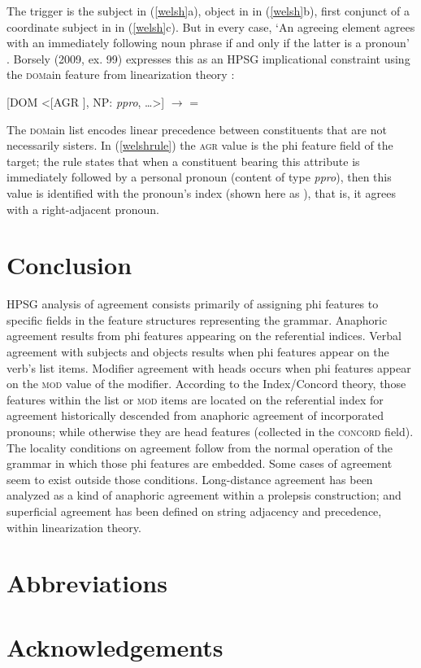\documentclass[output=paper]{langsci/langscibook}
\begin{document}
\noindent
The trigger is the subject in (\ref{welsh}a), object in in (\ref{welsh}b), first conjunct of a coordinate subject in in (\ref{welsh}c).  But in every case, `An agreeing element agrees with an immediately following noun phrase if and only if the latter is a pronoun' \citep[ex. \, 48]{Borsley:2009}.  Borsely (2009, ex. 99) expresses this as an HPSG implicational constraint using the \textsc{dom}ain feature from linearization theory \citep{reape:1994,Kathol:2000}:

\begin{exe}
\ex \label{welshrule}
[DOM  <[AGR ], NP: \textit{ppro}, \ldots >]  $\rightarrow$  = 
\end{exe}

\noindent
The \textsc{dom}ain list encodes linear precedence between constituents that are not necessarily sisters.  In (\ref{welshrule}) the \textsc{agr} value is the phi feature field of the target; the rule states that when a constituent bearing this attribute is immediately followed by a personal pronoun (content of type \textit{ppro}), then this value is identified with the pronoun's index (shown here as  ), that is, it agrees with a right-adjacent pronoun.  



\section{Conclusion} 

HPSG analysis of agreement consists primarily of assigning phi features to specific fields in the feature structures representing the grammar.  Anaphoric agreement results from phi features appearing on the referential indices.  Verbal agreement with subjects and objects results when phi features appear on the verb's \argst list items.  Modifier agreement with heads occurs when phi features appear on the \textsc{mod} value of the modifier.  According to the Index/Concord theory, those features within the \argst list or \textsc{mod} items are located  on the referential index for agreement historically descended from anaphoric agreement of incorporated pronouns; while otherwise they are head features (collected in the \textsc{concord} field).   The locality conditions on agreement follow from the normal operation of the grammar in which those phi features are embedded.  Some cases of agreement seem to exist outside those conditions.  Long-distance agreement has been analyzed as a kind of anaphoric agreement within a prolepsis construction; and superficial agreement has been defined on string adjacency and precedence, within linearization theory.  

\section*{Abbreviations}
\section*{Acknowledgements}




{\sloppy
\printbibliography[heading=subbibliography,notkeyword=this] 
}
\end{document}

